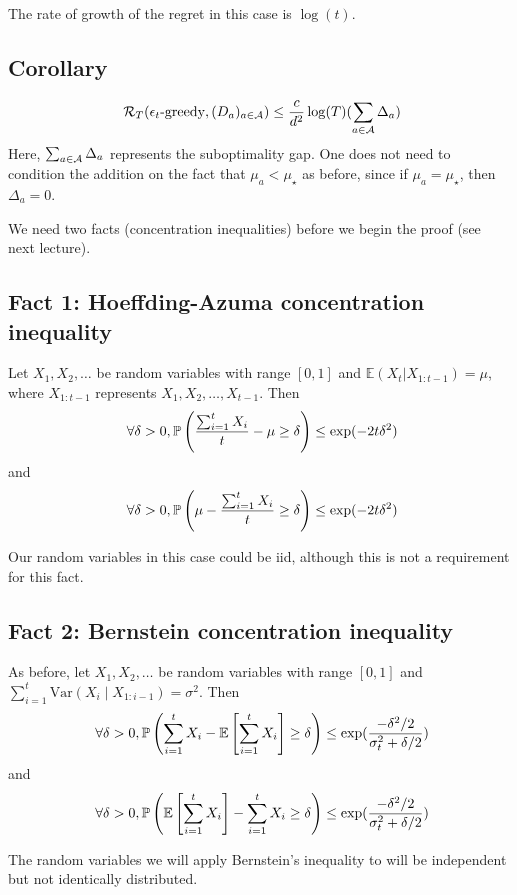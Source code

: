 \documentclass[11pt]{article}
\begin{document}
The rate of growth of the regret in this case is $\log(t)$.

\subsection{Corollary}
\[
\ \mathcal{R}_T(\epsilon_t\text{-greedy}, (D_a)_{a \in \mathcal{A}}) \le \frac{c}{d^2} \log(T) (\sum_{a \in \mathcal{A}} \Delta_a)
\]
Here, $\sum_{a \in \mathcal{A}} \Delta_a$ represents the suboptimality gap.  One does not need to condition the addition on the fact that $\mu_a < \mu_\star$ as before, since if $\mu_a = \mu_\star$, then $\Delta_a = 0$.  

We need two facts (concentration inequalities) before we begin the proof (see next lecture).

\subsection{Fact 1: Hoeffding-Azuma concentration inequality}
Let $X_1, X_2, \ldots$ be random variables with range $[0, 1]$ and $\mathbb{E}(X_t | X_{1:t-1}) = \mu$, where $X_{1:t-1}$ represents $X_1, X_2, \ldots, X_{t-1}$.  Then 
\[
\ \forall \delta > 0, \mathbb{P}\left( \frac{\sum_{i=1}^t X_i}{t} - \mu \ge \delta \right) \le \exp(-2t\delta^2)
\]
 and 
 \[
 \ \forall \delta >0, \mathbb{P}\left( \mu -\frac{\sum_{i=1}^t X_i}{t} \ge \delta \right) \le \exp(-2t\delta^2)
 \]

Our random variables in this case could be iid, although this is not a requirement for this fact.

\subsection{Fact 2: Bernstein concentration inequality}
As before, let $X_1, X_2, \ldots$ be random variables with range $[0,1]$ and $\sum_{i=1}^t \mathrm{Var}(X_i \mid X_{1:i-1}) = \sigma^2$.  Then 
\[
\ \forall \delta>0, \mathbb{P}\left( \sum_{i=1}^t X_i - \mathbb{E}\left[ \sum_{i=1}^t X_i \right] \ge \delta \right) \le \exp(\frac{-\delta^2/2}{\sigma_t^2+ \delta/2})
\]
and 
\[
\ \forall \delta >0, \mathbb{P}\left(  \mathbb{E}\left[ \sum_{i=1}^t X_i \right] - \sum_{i=1}^t X_i \ge \delta \right) \le \exp(\frac{-\delta^2/2}{\sigma_t^2+ \delta/2})
\]

The random variables we will apply Bernstein's inequality to will be independent but not identically distributed.


\end{document}
